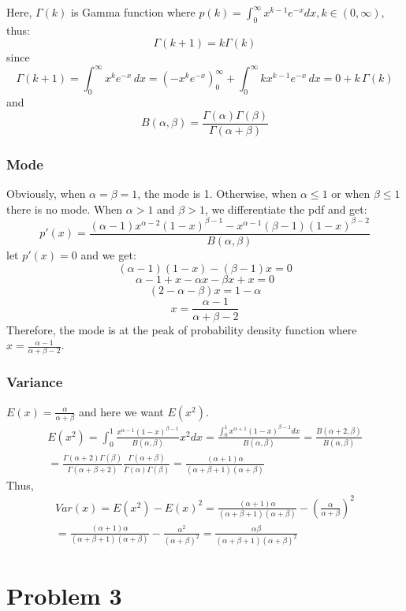 \documentclass[11pt, oneside]{article}
\begin{document}
Here, $\Gamma(k)$ is Gamma function where $p(k) = \int_{0}^{\infty}{x^{k-1}e^{-x}dx}, k \in (0, \infty)$, thus:
$$\Gamma(k+1)=k\Gamma(k)$$since $$\Gamma(k + 1) = \int_0^\infty x^k e^{-x} \, dx = \left(-x^k e^{-x}\right)_0^\infty + \int_0^\infty k x^{k-1} e^{-x} \, dx = 0 + k \, \Gamma(k)$$
and$$B(\alpha, \beta) = \frac{\Gamma(\alpha)\Gamma(\beta)}{\Gamma(\alpha+\beta)}$$
\subsubsection{Mode}
Obviously, when $\alpha = \beta = 1$, the mode is 1. Otherwise, when $\alpha \leq 1$ or when $\beta \leq 1$ there is no mode.
When $\alpha > 1$ and $\beta > 1$, we differentiate the pdf and get:
$$p'(x) = \frac{(\alpha-1)x^{\alpha-2}(1-x)^{\beta-1}-x^{\alpha-1}(\beta-1)(1-x)^{\beta-2}}{B(\alpha, \beta)}$$
let $p'(x)=0$ and we get:
$$(\alpha-1)(1-x)-(\beta-1)x=0$$
$$\alpha-1+x-\alpha{}x-\beta{}x+x=0$$
$$(2-\alpha-\beta)x=1-\alpha$$
$$x=\frac{\alpha-1}{\alpha+\beta-2}$$
Therefore, the mode is at the peak of probability density function where $x=\frac{\alpha-1}{\alpha+\beta-2}$.
\subsubsection{Variance}
$E(x) = \frac{\alpha}{\alpha+\beta}$ and here we want $E(x^2)$.
\begin{equation*}
\begin{multlined}
E(x^2)=\int_{0}^{1}{\frac{x^{\alpha-1}(1-x)^{\beta-1}}{B(\alpha, \beta)}x^2dx}=\frac{\int_0^1{x^{\alpha+1}(1-x)^{\beta-1}}dx}{B(\alpha, \beta)}=\frac{B(\alpha+2, \beta)}{B(\alpha, \beta)}\\
=\frac{\Gamma(\alpha+2)\Gamma(\beta)}{\Gamma(\alpha+\beta+2)}\frac{\Gamma(\alpha+\beta)}{\Gamma(\alpha)\Gamma(\beta)}=\frac{(\alpha+1)\alpha}{(\alpha+\beta+1)(\alpha+\beta)}
\end{multlined}
\end{equation*}
Thus,
\begin{equation*}
\begin{multlined}
Var(x) = E(x^2)-E(x)^2 =\frac{(\alpha+1)\alpha}{(\alpha+\beta+1)(\alpha+\beta)}-(\frac{\alpha}{\alpha+\beta})^2\\
=\frac{(\alpha+1)\alpha}{(\alpha+\beta+1)(\alpha+\beta)}-\frac{\alpha^2}{(\alpha+\beta)^2}
=\frac{\alpha\beta}{(\alpha+\beta+1)(\alpha+\beta)^2}
\end{multlined}
\end{equation*}

\section{Problem 3}
\end{document}
